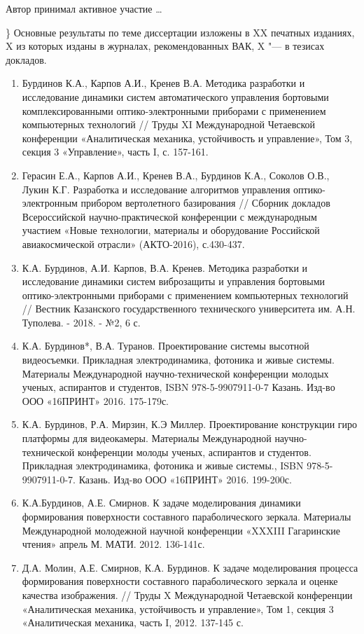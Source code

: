 {\contribution} Автор принимал активное участие \ldots

{\publications\} Основные результаты по теме диссертации изложены в XX печатных изданиях,
    X из которых изданы в журналах, рекомендованных ВАК,
    X "--- в тезисах докладов.
    
\begin{enumerate}
  \item Бурдинов К.А., Карпов А.И., Кренев В.А.   Методика разработки и исследование динамики систем автоматического управления бортовыми комплексированными оптико-электронными приборами с применением компьютерных технологий // Труды XI Международной Четаевской конференции «Аналитическая механика, устойчивость и управление», Том 3, секция 3 «Управление», часть I, с. 157-161.
  \item Герасин Е.А., Карпов А.И., Кренев В.А., Бурдинов К.А., Соколов О.В., Лукин К.Г. Разработка и исследование алгоритмов управления оптико-электронным прибором вертолетного базирования // Сборник докладов Всероссийской научно-практической конференции с международным участием «Новые технологии, материалы и оборудование Российской авиакосмической отрасли» (АКТО-2016), с.430-437.
  \item К.А. Бурдинов, А.И. Карпов, В.А. Кренев. Методика разработки и исследование динамики систем виброзащиты и управления бортовыми оптико-электронными приборами с применением компьютерных технологий // Вестник Казанского государственного технического университета им. А.Н. Туполева. - 2018. - №2, 6 с.
  \item К.А. Бурдинов*, В.А. Туранов. Проектирование системы высотной видеосъемки. Прикладная электродинамика, фотоника и живые системы. Материалы Международной научно-технической конференции молодых ученых, аспирантов и студентов, ISBN 978-5-9907911-0-7
Казань. Изд-во ООО «16ПРИНТ» 2016. 175-179с.
  \item К.А. Бурдинов, Р.А. Мирзин, К.Э Миллер. Проектирование конструкции гиро платформы для видеокамеры. Материалы Международной научно-технической конференции молоды ученых, аспирантов и студентов. Прикладная электродинамика, фотоника и живые системы., ISBN 978-5-9907911-0-7. Казань. Изд-во ООО «16ПРИНТ» 2016. 199-200с.
  \item К.А.Бурдинов, А.Е. Смирнов. К задаче моделирования динамики формирования поверхности составного параболического зеркала. Материалы Международной молодежной научной конференции «XXXIII Гагаринские чтения» апрель М. МАТИ. 2012. 136-141с.
  \item Д.А. Молин, А.Е. Смирнов, К.А. Бурдинов. К задаче моделирования процесса формирования поверхности составного параболического зеркала и оценке качества изображения. // Труды X Международной Четаевской конференции «Аналитическая механика, устойчивость и управление», Том 1, секция 3 «Аналитическая механика, часть I, 2012. 137-145 с.

\end{enumerate}}
